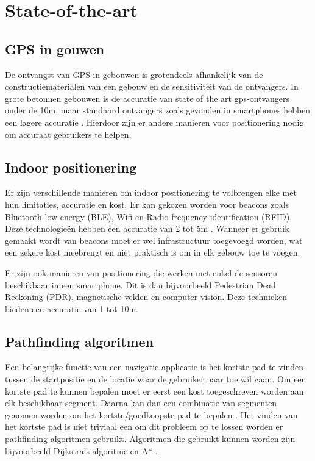 \section{State-of-the-art}
\label{sec:state-of-the-art}

\subsection{GPS in gouwen}
De ontvangst van GPS in gebouwen is grotendeels afhankelijk van de constructiematerialen van een gebouw en de sensitiviteit van de ontvangers. In grote betonnen gebouwen is de accuratie van state of the art gps-ontvangers onder de 10m, maar standaard ontvangers zoals gevonden in smartphones hebben een lagere accuratie \autocite{Kjaergaard2010}. Hierdoor zijn er andere manieren voor positionering nodig om accuraat gebruikers te helpen.

\subsection{Indoor positionering}
Er zijn verschillende manieren om indoor positionering te volbrengen elke met hun limitaties, accuratie en kost. Er kan gekozen worden voor beacons zoals Bluetooth low energy (BLE), Wifi en Radio-frequency identification (RFID). Deze technologieën hebben een accuratie van 2 tot 5m \autocite{MendozaSilva2019}. Wanneer er gebruik gemaakt wordt van beacons moet er wel infrastructuur toegevoegd worden, wat een zekere kost meebrengt en niet praktisch is om in elk gebouw toe te voegen.

Er zijn ook manieren van positionering die werken met enkel de sensoren beschikbaar in een smartphone. Dit is dan bijvoorbeeld Pedestrian Dead Reckoning (PDR), magnetische velden en computer vision. Deze technieken bieden een accuratie van 1 tot 10m\autocite{MendozaSilva2019}.

\subsection{Pathfinding algoritmen}
Een belangrijke functie van een navigatie applicatie is het kortste pad te vinden tussen de startpositie en de locatie waar de gebruiker naar toe wil gaan. Om een kortste pad te kunnen bepalen moet er eerst een kost toegeschreven worden aan elk beschikbaar segment. Daarna kan dan een combinatie van segmenten genomen worden om het kortste/goedkoopste pad te bepalen \autocite{Sidhu2020}. Het vinden van het kortste pad is niet triviaal een om dit probleem op te lossen worden er pathfinding algoritmen gebruikt. Algoritmen die gebruikt kunnen worden zijn bijvoorbeeld Dijkstra’s algoritme en A* \autocite{Goel2017}.

